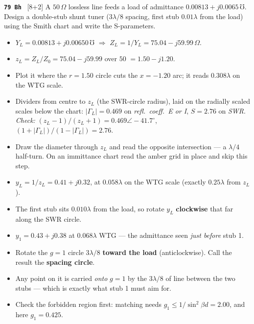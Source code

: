 \begin{asked}{\textbf{\texttt{79 Bh}} \ [8+2]}
A $50\,\Omega$ lossless line feeds a load of admittance $0.00813+j0.0065\,\mho$. Design a double-stub shunt tuner ($3\lambda/8$ spacing, first stub $0.01\lambda$ from the load) using the Smith chart and write the S-parameters.
\end{asked}
\begin{itemize}
  \item $Y_L = 0.00813 + j0.00650\,\mho$ $\Rightarrow$ $Z_L = 1/Y_L = 75.04 - j59.99\,\Omega$.
\end{itemize}
\begin{itemize}
  \item $z_L = Z_L/Z_0 = 75.04 - j59.99$ over $50$ $=1.50 - j1.20$.
  \item Plot it where the $r = 1.50$ circle cuts the $x = -1.20$ arc; it reads $0.308\lambda$ on the WTG scale.
  \item Dividers from centre to $z_L$ (the SWR-circle radius), laid on the radially scaled scales below the chart: $|\Gamma_L| = 0.469$ on \emph{refl.\ coeff.\ E or I}, $S = 2.76$ on \emph{SWR}. \textit{Check:} $(z_L-1)/(z_L+1) = 0.469\angle -41.7^\circ$, $(1+|\Gamma_L|)/(1-|\Gamma_L|) = 2.76$.
\end{itemize}
\begin{itemize}
  \item Draw the diameter through $z_L$ and read the opposite intersection --- a $\lambda/4$ half-turn. On an immittance chart read the amber grid in place and skip this step.
  \item $y_L = 1/z_L = 0.41 + j0.32$, at $0.058\lambda$ on the WTG scale (exactly $0.25\lambda$ from $z_L$).
\end{itemize}
\begin{itemize}
  \item The first stub sits $0.010\lambda$ from the load, so rotate $y_L$ \textbf{clockwise} that far along the SWR circle.
  \item $y_1 = 0.43 + j0.38$ at $0.068\lambda$ WTG --- the admittance seen \emph{just before} stub 1.
\end{itemize}
\begin{itemize}
  \item Rotate the $g=1$ circle $3\lambda/8$ \textbf{toward the load} (anticlockwise). Call the result the \textbf{spacing circle}.
  \item Any point on it is carried \emph{onto} $g=1$ by the $3\lambda/8$ of line between the two stubs --- which is exactly what stub 1 must aim for.
  \item Check the forbidden region first: matching needs $g_1 \le 1/\sin^2\beta d = 2.00$, and here $g_1 = 0.425$. \checkmark
\end{itemize}

